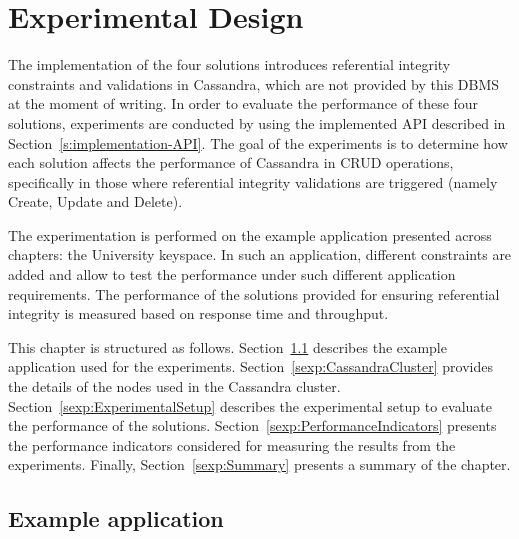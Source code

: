 \chapter{Experimental Design}

The implementation of the four solutions  introduces referential integrity
constraints and validations in Cassandra,  which are not provided by this
\ac{DBMS} at the moment of writing.  In order to evaluate the performance of
these four solutions,  experiments are conducted by using the implemented
\ac{API} described in Section~\ref{s:implementation-API}.    The goal of the
experiments is to determine how each solution affects the performance of 
Cassandra in \ac{CRUD} operations,  specifically in those where referential
integrity validations are triggered (namely Create,  Update and Delete).

The experimentation is performed on the example application presented across
chapters: the University keyspace.  In such an application,  different constraints
are added and allow to test the performance under such different application
requirements.  The performance of the  solutions provided for ensuring
referential integrity  is measured based on response time and throughput. 

This chapter is structured as follows. 
Section~\ref{sexp:BenchmarkKeyspace} describes the example application 
used for the experiments.  Section~\ref{sexp:CassandraCluster} provides the
details of the nodes used in the Cassandra cluster.  Section~\ref{sexp:ExperimentalSetup}
describes the experimental setup to evaluate the performance of the solutions. 
Section~\ref{sexp:PerformanceIndicators} presents the performance indicators
 considered for measuring the results from the experiments.  Finally, 
Section~\ref{sexp:Summary} presents a summary of the chapter. 


\section{Example application} \label{sexp:BenchmarkKeyspace}

